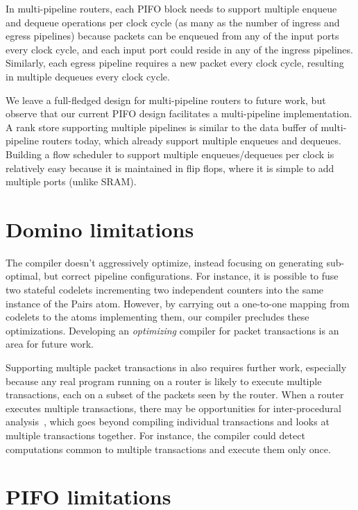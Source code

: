 In multi-pipeline routers, each PIFO block needs to support multiple enqueue
and dequeue operations per clock cycle (as many as the number of ingress and
egress pipelines) because packets can be enqueued from any of the input ports
every clock cycle, and each input port could reside in any of the ingress
pipelines. Similarly, each egress pipeline requires a new packet every clock
cycle, resulting in multiple dequeues every clock cycle.

We leave a full-fledged design for multi-pipeline routers to future work, but
observe that our current PIFO design facilitates a multi-pipeline
implementation.  A rank store supporting multiple pipelines is similar to the
data buffer of multi-pipeline routers today, which already support multiple
enqueues and dequeues. Building a flow scheduler to support multiple
enqueues/dequeues per clock is relatively easy because it is maintained in flip
flops, where it is simple to add multiple ports (unlike SRAM).

\section{Domino limitations}
\label{sec:domino_limitations}
The \pktlanguage compiler doesn't aggressively optimize, instead focusing on
generating sub-optimal, but correct pipeline configurations. For instance, it is
possible to fuse two stateful codelets incrementing two independent counters
into the same instance of the Pairs atom. However, by carrying out a one-to-one
mapping from codelets to the atoms implementing them, our compiler precludes
these optimizations.  Developing an {\em optimizing} compiler for packet
transactions is an area for future work.

Supporting multiple packet transactions in \pktlanguage also requires further
work, especially because any real program running on a router is likely to
execute multiple transactions, each on a subset of the packets seen by the
router. When a router executes multiple transactions, there may be
opportunities for inter-procedural analysis~\cite{dragonbook}, which goes
beyond compiling individual transactions and looks at multiple transactions
together.  For instance, the compiler could detect computations common to
multiple transactions and execute them only once.

\section{PIFO limitations}
\label{sec:pifo_limitations}

